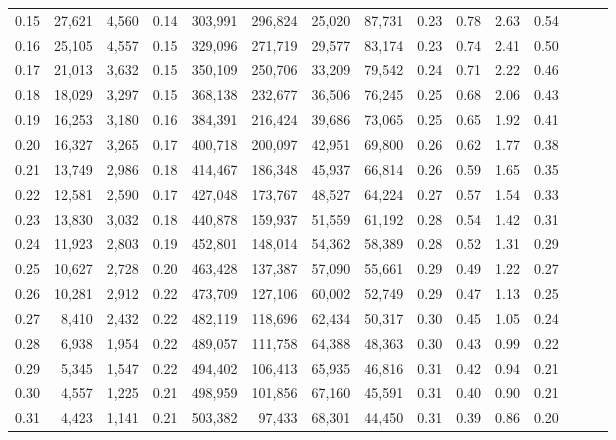 \begin{tabular}{rrrrrrrrrrrrrrr}
0.15 &  27,621 &  4,560 &  0.14 &  303,991 &  296,824 &   25,020 &   87,731 &  0.23 &  0.78 &  2.63 &      0.54 \\
0.16 &  25,105 &  4,557 &  0.15 &  329,096 &  271,719 &   29,577 &   83,174 &  0.23 &  0.74 &  2.41 &      0.50 \\
0.17 &  21,013 &  3,632 &  0.15 &  350,109 &  250,706 &   33,209 &   79,542 &  0.24 &  0.71 &  2.22 &      0.46 \\
0.18 &  18,029 &  3,297 &  0.15 &  368,138 &  232,677 &   36,506 &   76,245 &  0.25 &  0.68 &  2.06 &      0.43 \\
0.19 &  16,253 &  3,180 &  0.16 &  384,391 &  216,424 &   39,686 &   73,065 &  0.25 &  0.65 &  1.92 &      0.41 \\
0.20 &  16,327 &  3,265 &  0.17 &  400,718 &  200,097 &   42,951 &   69,800 &  0.26 &  0.62 &  1.77 &      0.38 \\
0.21 &  13,749 &  2,986 &  0.18 &  414,467 &  186,348 &   45,937 &   66,814 &  0.26 &  0.59 &  1.65 &      0.35 \\
0.22 &  12,581 &  2,590 &  0.17 &  427,048 &  173,767 &   48,527 &   64,224 &  0.27 &  0.57 &  1.54 &      0.33 \\
0.23 &  13,830 &  3,032 &  0.18 &  440,878 &  159,937 &   51,559 &   61,192 &  0.28 &  0.54 &  1.42 &      0.31 \\
0.24 &  11,923 &  2,803 &  0.19 &  452,801 &  148,014 &   54,362 &   58,389 &  0.28 &  0.52 &  1.31 &      0.29 \\
0.25 &  10,627 &  2,728 &  0.20 &  463,428 &  137,387 &   57,090 &   55,661 &  0.29 &  0.49 &  1.22 &      0.27 \\
0.26 &  10,281 &  2,912 &  0.22 &  473,709 &  127,106 &   60,002 &   52,749 &  0.29 &  0.47 &  1.13 &      0.25 \\
0.27 &   8,410 &  2,432 &  0.22 &  482,119 &  118,696 &   62,434 &   50,317 &  0.30 &  0.45 &  1.05 &      0.24 \\
0.28 &   6,938 &  1,954 &  0.22 &  489,057 &  111,758 &   64,388 &   48,363 &  0.30 &  0.43 &  0.99 &      0.22 \\
0.29 &   5,345 &  1,547 &  0.22 &  494,402 &  106,413 &   65,935 &   46,816 &  0.31 &  0.42 &  0.94 &      0.21 \\
0.30 &   4,557 &  1,225 &  0.21 &  498,959 &  101,856 &   67,160 &   45,591 &  0.31 &  0.40 &  0.90 &      0.21 \\
0.31 &   4,423 &  1,141 &  0.21 &  503,382 &   97,433 &   68,301 &   44,450 &  0.31 &  0.39 &  0.86 &      0.20 \\

\end{tabular}
